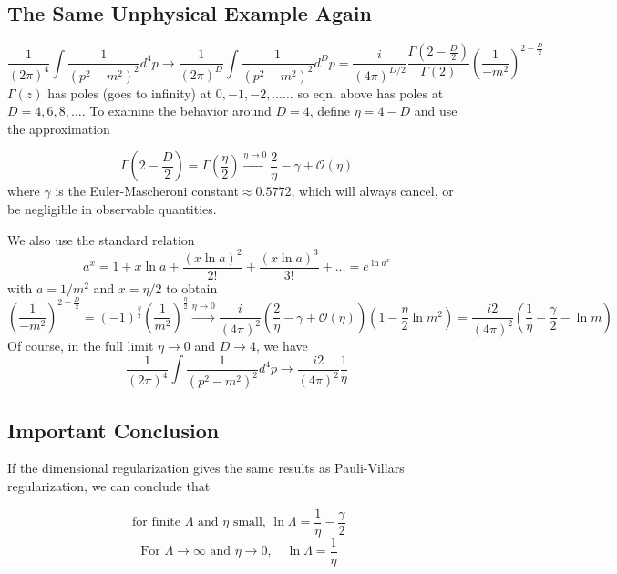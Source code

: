 \subsection{The Same Unphysical Example Again}
$$\frac{1}{(2 \pi)^{4}} \int \frac{1}{\left(p^{2}-m^{2}\right)^{2}} d^{4} p \longrightarrow \frac{1}{(2 \pi)^{D}} \int \frac{1}{\left(p^{2}-m^{2}\right)^{2}} d^{D} p=\frac{i}{(4 \pi)^{D / 2}} \frac{\Gamma\left(2-\frac{D}{2}\right)}{\Gamma(2)}\left(\frac{1}{-m^{2}}\right)^{2-\frac{D}{2}}$$
$\Gamma(z)$ has poles (goes to infinity) at $0,-1,-2, \ldots \ldots$ so eqn. above has poles at $D=4,6,8, \ldots$. To examine the behavior around $D=4$, define $\eta=4-D$ and use the approximation 
\begin{qt}
    \begin{equation}\Gamma\left(2-\frac{D}{2}\right)=\Gamma\left(\frac{\eta}{2}\right)\overset{\eta\rightarrow0}{\rightarrow} \frac{2}{\eta}-\gamma+\mathcal{O}(\eta)
    \label{gamma-approx}
    \end{equation}
where $\gamma$ is the Euler-Mascheroni constant$\approx0.5772$, which will always cancel, or be negligible in observable quantities.
\end{qt}
We also use the standard relation
\begin{equation}a^{x}=1+x \ln a+\frac{(x \ln a)^{2}}{2 !}+\frac{(x \ln a)^{3}}{3 !}+\ldots=e^{\ln a^x}
\label{ax-expand}
\end{equation}
with $a=1 / m^{2}$ and $x=\eta / 2$ to obtain 
$$\left(\frac{1}{-m^{2}}\right)^{2-\frac{D}{2}}=(-1)^{\frac{\eta}{2}}\left(\frac{1}{m^{2}}\right)^{\frac{\eta}{2}}\overset{\eta\rightarrow0}{\rightarrow}\frac{i}{(4 \pi)^{2}}\left(\frac{2}{\eta}-\gamma+\mathcal{O}(\eta)\right)\left(1-\frac{\eta}{2} \ln m^{2}\right)=\frac{i 2}{(4 \pi)^{2}}\left(\frac{1}{\eta}-\frac{\gamma}{2}-\ln m\right)
$$
Of course, in the full limit $\eta \rightarrow 0$ and $D \rightarrow 4$, we have
\begin{equation}
\frac{1}{(2 \pi)^{4}} \int \frac{1}{\left(p^{2}-m^{2}\right)^{2}} d^{4} p\rightarrow\frac{i 2}{(4 \pi)^{2}} \frac{1}{\eta}
\end{equation}
\subsection{Important Conclusion}
If the dimensional regularization gives the same results as Pauli-Villars regularization, we can conclude that 
\begin{qt}
    \begin{equation}
        \text { for finite } \Lambda \text { and } \eta \text { small, } \ln \Lambda=\frac{1}{\eta}-\frac{\gamma}{2}
        \label{eta-Lambda-relation}
    \end{equation}
    $$\text { For } \Lambda \rightarrow \infty \text { and } \eta \rightarrow 0, \quad \ln \Lambda=\frac{1}{\eta}$$
\end{qt}
